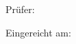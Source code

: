 \begin{titlepage}
\begin{center}
{\vspace{1cm}

Prüfer: \dokumentenpruefer

\vspace{1cm}

Eingereicht am: \abgabedatum

}

\end{center}


\end{titlepage}

